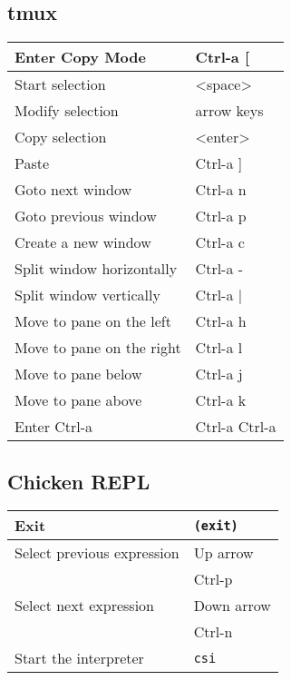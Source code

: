 \documentclass[10pt,a4paper,landscape,english,twoside]{article}
\begin{document}
\begin{multicols}{2}
\subsection*{tmux}
{
\setlength{\extrarowheight}{1.5pt}
\begin{tabular}[t]{|l|l|}
\hline
Enter Copy Mode & Ctrl-a [ \\ \hline
\hspace{0.5cm} Start selection & <space> \\ \hline
\hspace{0.5cm} Modify selection & arrow keys \\ \hline
\hspace{0.5cm} Copy selection & <enter> \\ \hline
Paste & Ctrl-a ] \\ \hline
Goto next window & Ctrl-a n \\ \hline
Goto previous window & Ctrl-a p \\ \hline
Create a new window & Ctrl-a c \\ \hline
Split window horizontally & Ctrl-a - \\ \hline
Split window vertically & Ctrl-a | \\ \hline
Move to pane on the left & Ctrl-a h \\ \hline
Move to pane on the right & Ctrl-a l \\ \hline
Move to pane below & Ctrl-a j \\ \hline
Move to pane above & Ctrl-a k \\ \hline
Enter Ctrl-a & Ctrl-a Ctrl-a \\ \hline
\end{tabular}
}
\subsection*{Chicken REPL}
{
\setlength{\extrarowheight}{1.5pt}
\begin{tabular}[t]{|l|l|}
\hline
Exit & \texttt{(exit)} \\ \hline
Select previous expression & Up arrow \\
& Ctrl-p \\ \hline
Select next expression & Down arrow \\ 
& Ctrl-n \\ \hline
Start the interpreter & \texttt{csi} \\ \hline
\end{tabular}
}


\end{multicols}
\end{document}
